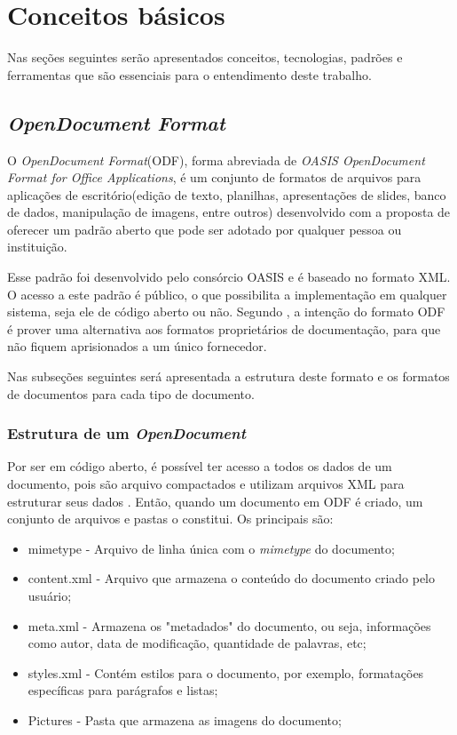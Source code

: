 \chapter{Conceitos básicos}
\label{cap2}
Nas seções seguintes serão apresentados conceitos, tecnologias, padrões e ferramentas que são essenciais para o entendimento deste trabalho.

\section{\textit{OpenDocument Format}}
O \textit{OpenDocument Format}(ODF), forma abreviada de \textit{OASIS OpenDocument Format for Office Applications}, é um conjunto de formatos de arquivos para aplicações de escritório(edição de texto, planilhas, apresentações de slides, banco de dados, manipulação de imagens, entre outros) desenvolvido com a proposta de oferecer um padrão aberto que pode ser adotado por qualquer pessoa ou instituição. 

Esse padrão foi desenvolvido pelo consórcio OASIS e é baseado no formato XML. O acesso a este padrão é público, o que possibilita a implementação em qualquer sistema, seja ele de código aberto ou não. Segundo \cite{ronaldo}, a intenção do formato ODF é prover uma alternativa aos formatos proprietários de documentação, para que não fiquem aprisionados a um único fornecedor.

Nas subseções seguintes será apresentada a estrutura deste formato e os formatos de documentos para cada tipo de documento.

\subsection{Estrutura de um \textit{OpenDocument}}

Por ser em código aberto, é possível ter acesso a todos os dados de um documento, pois são arquivo compactados e utilizam arquivos XML para estruturar seus dados \cite{oasis}. Então, quando um documento em ODF é criado, um conjunto de arquivos e pastas o constitui. Os principais são:
\begin{itemize}
 \item mimetype - Arquivo de linha única com o \textit{mimetype} do documento;
 \item content.xml - Arquivo que armazena o conteúdo do documento criado pelo usuário;
 \item meta.xml - Armazena os "metadados" do documento, ou seja, informações como autor, data de modificação, quantidade de palavras, etc;
 \item styles.xml - Contém estilos para o documento, por exemplo, formatações específicas para parágrafos e listas;
 \item Pictures - Pasta que armazena as imagens do documento;
\end{itemize}

